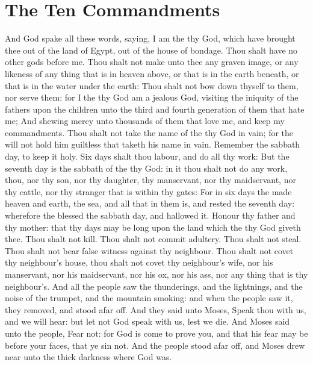 \section*{The Ten Commandments}
\begin{biblechapter} %
\verse And God spake all these words, saying,
\verse I am the \LORD thy God, which have brought thee out of the land of Egypt, out of the house of bondage.
\verse Thou shalt have no other gods before me.
\verse Thou shalt not make unto thee any graven image, or any likeness of any thing that is in heaven above, or that is in the earth beneath, or that is in the water under the earth:
\verse Thou shalt not bow down thyself to them, nor serve them: for I the \LORD thy God am a jealous God, visiting the iniquity of the fathers upon the children unto the third and fourth generation of them that hate me;
\verse And shewing mercy unto thousands of them that love me, and keep my commandments.
\verse Thou shalt not take the name of the \LORD thy God in vain; for the \LORD will not hold him guiltless that taketh his name in vain.
\verse Remember the sabbath day, to keep it holy.
\verse Six days shalt thou labour, and do all thy work:
\verse But the seventh day is the sabbath of the \LORD thy God: in it thou shalt not do any work, thou, nor thy son, nor thy daughter, thy manservant, nor thy maidservant, nor thy cattle, nor thy stranger that is within thy gates:
\verse For in six days the \LORD made heaven and earth, the sea, and all that in them is, and rested the seventh day: wherefore the \LORD blessed the sabbath day, and hallowed it.
\verse Honour thy father and thy mother: that thy days may be long upon the land which the \LORD thy God giveth thee.
\verse Thou shalt not kill.
\verse Thou shalt not commit adultery.
\verse Thou shalt not steal.
\verse Thou shalt not bear false witness against thy neighbour.
\verse Thou shalt not covet thy neighbour's house, thou shalt not covet thy neighbour's wife, nor his manservant, nor his maidservant, nor his ox, nor his ass, nor any thing that is thy neighbour's.
\verse And all the people saw the thunderings, and the lightnings, and the noise of the trumpet, and the mountain smoking: and when the people saw it, they removed, and stood afar off.
\verse And they said unto Moses, Speak thou with us, and we will hear: but let not God speak with us, lest we die.
\verse And Moses said unto the people, Fear not: for God is come to prove you, and that his fear may be before your faces, that ye sin not.
\verse And the people stood afar off, and Moses drew near unto the thick darkness where God was.

\end{biblechapter}
